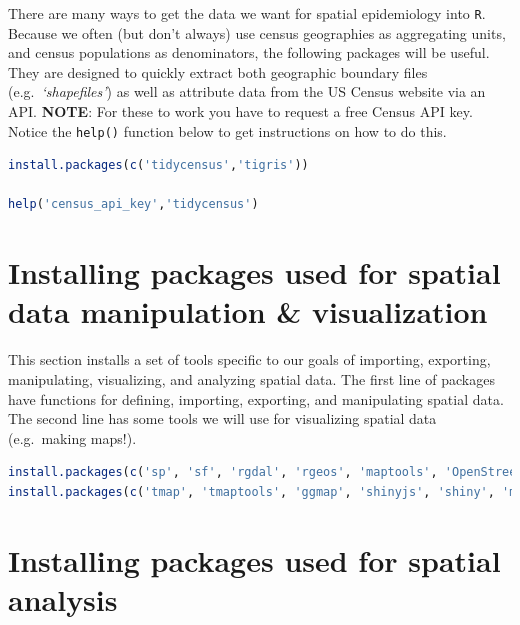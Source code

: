 \documentclass[
]{book}
\newcommand{\passthrough}[1]{#1}
\begin{document}
There are many ways to get the data we want for spatial epidemiology into \passthrough{\lstinline!R!}. Because we often (but don't always) use census geographies as aggregating units, and census populations as denominators, the following packages will be useful. They are designed to quickly extract both geographic boundary files (e.g.~\emph{`shapefiles'}) as well as attribute data from the US Census website via an API. \textbf{NOTE}: For these to work you have to request a free Census API key. Notice the \passthrough{\lstinline!help()!} function below to get instructions on how to do this.

\begin{lstlisting}[language=R]
install.packages(c('tidycensus','tigris')) 

help('census_api_key','tidycensus')
\end{lstlisting}

\hypertarget{installing-packages-used-for-spatial-data-manipulation-visualization}{%
\section*{Installing packages used for spatial data manipulation \& visualization}\label{installing-packages-used-for-spatial-data-manipulation-visualization}}

This section installs a set of tools specific to our goals of importing, exporting, manipulating, visualizing, and analyzing spatial data. The first line of packages have functions for defining, importing, exporting, and manipulating spatial data. The second line has some tools we will use for visualizing spatial data (e.g.~making maps!).

\begin{lstlisting}[language=R]
install.packages(c('sp', 'sf', 'rgdal', 'rgeos', 'maptools', 'OpenStreetMap'))  
install.packages(c('tmap', 'tmaptools', 'ggmap', 'shinyjs', 'shiny', 'micromap')) 
\end{lstlisting}

\hypertarget{installing-packages-used-for-spatial-analysis}{%
\section*{Installing packages used for spatial analysis}\label{installing-packages-used-for-spatial-analysis}}
\end{document}
